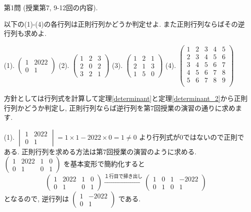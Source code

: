 \documentclass[dvipdfmx,a4paper,11pt]{article}
\theoremstyle{definition}
\begin{document}
{\Large 第1問} (授業第7, 9-12回の内容).
 
 \vspace{11pt}
以下の(1)-(4)の各行列は正則行列かどうか判定せよ. また正則行列ならばその逆行列も求めよ.
 
  \vspace{11pt}
 (1).
 $
 \begin{pmatrix}
1& 2022 \\
0& 1
 \end{pmatrix}
 $
(2).
$
 \begin{pmatrix}
1 &2&3 \\
2 & 0 & 2\\
3&2 &1
 \end{pmatrix}
 $
(3).
$
 \begin{pmatrix}
1 &2&1 \\
2 & 1& 3\\
1&5 &0
 \end{pmatrix}
 $
 (4).
 $
 \begin{pmatrix}
 1& 2& 3  & 4&5\\
 2& 3& 4  & 5&6\\
 3& 4& 5 & 6&7\\
 4& 5& 6 & 7&8\\
 5& 6& 7 & 8&9\\
 \end{pmatrix}
 $

 \vspace{11pt}
 
\hspace{-11pt}{\Large $\bullet$ 第1問解答例.}

方針としては行列式を計算して定理\ref{determinant}と定理\ref{determinant_2}から正則行列かどうか判定し, 正則行列ならば逆行列を第7回授業の演習の通りに求めます. 

 \vspace{11pt}
 
(1). 
 $
 \begin{vmatrix}
1& 2022 \\
0& 1
 \end{vmatrix}
 =
 1 \times 1 - 2022 \times 0 
 = 1 \neq 0
 $
 より行列式が0ではないので正則である.
 正則行列を求める方法は第7回授業の演習のように求める. 
 $
 \begin{pmatrix}
1& 2022 &1 & 0 \\
0& 1& 0& 1
 \end{pmatrix}
 $
 を基本変形で簡約化すると
 $$
 \begin{pmatrix}
1& 2022 &1 & 0 \\
0& 1& 0& 1
 \end{pmatrix}
   \overset{\text{１行目で掃き出し}}{\longrightarrow} 
  \begin{pmatrix}
1& 0 &1 & -2022 \\
0& 1& 0& 1
 \end{pmatrix}
 $$
となるので, 逆行列は
$ \begin{pmatrix}
1& -2022 \\
0& 1
 \end{pmatrix}
 $
 である. 
\end{document}
